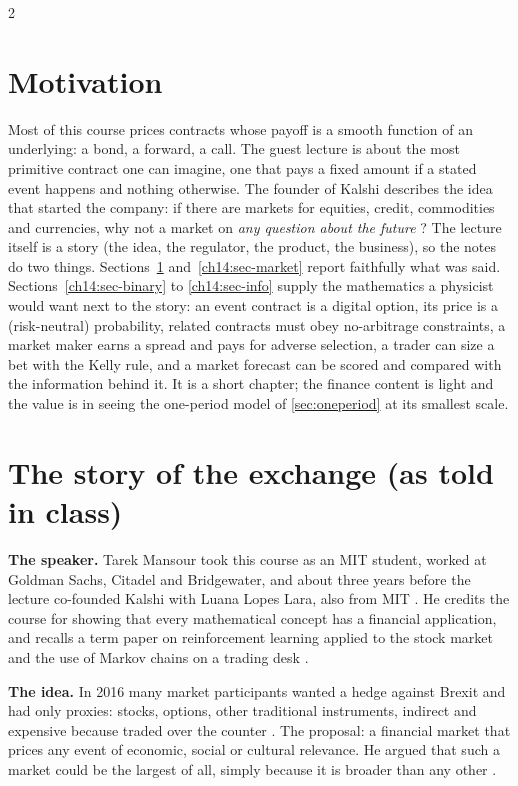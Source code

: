 \begin{paracol}{2}
\section*{Motivation}
Most of this course prices contracts whose payoff is a smooth function of an underlying: a bond, a
forward, a call. The guest lecture is about the most primitive contract one can imagine, one that pays a
fixed amount if a stated event happens and nothing otherwise. The founder of Kalshi describes the idea
that started the company: if there are markets for equities, credit, commodities and currencies, why not a
market on \emph{any question about the future} ? The lecture itself is a story (the idea, the
regulator, the product, the business), so the notes do two things. Sections~\ref{ch14:sec-story}
and~\ref{ch14:sec-market} report faithfully what was said. Sections~\ref{ch14:sec-binary} to
\ref{ch14:sec-info} supply the mathematics a physicist would want next to the story: an event contract
is a digital option, its price is a (risk-neutral) probability, related contracts must obey
no-arbitrage constraints, a market maker earns a spread and pays for adverse selection, a trader can size a
bet with the Kelly rule, and a market forecast can be scored and compared with the information behind it.
It is a short chapter; the finance content is light and the value is in seeing the one-period model of
\cref{sec:oneperiod} at its smallest scale.

\section{The story of the exchange (as told in class)}\label{ch14:sec-story}

\textbf{The speaker.} Tarek Mansour took this course as an MIT student, worked at Goldman Sachs,
Citadel and Bridgewater, and about three years before the lecture co-founded Kalshi with Luana Lopes Lara,
also from MIT . He credits the course for showing that every
mathematical concept has a financial application, and recalls a term paper on reinforcement learning applied
to the stock market and the use of Markov chains on a trading desk .

\textbf{The idea.} In 2016 many market participants wanted a hedge against Brexit and had only proxies:
stocks, options, other traditional instruments, indirect and expensive because traded over the counter
. The proposal: a financial market that prices any event of economic,
social or cultural relevance. He argued that such a market could be the largest of all, simply because it is
broader than any other .


\end{paracol}
